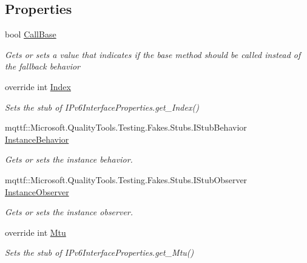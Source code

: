 \subsection*{Properties}
\begin{DoxyCompactItemize}
\item 
bool \hyperlink{class_system_1_1_net_1_1_network_information_1_1_fakes_1_1_stub_i_pv6_interface_properties_a4cad5236d0ed7beeef0dd88210829e15}{Call\-Base}
\begin{DoxyCompactList}\small\item\em Gets or sets a value that indicates if the base method should be called instead of the fallback behavior\end{DoxyCompactList}\item 
override int \hyperlink{class_system_1_1_net_1_1_network_information_1_1_fakes_1_1_stub_i_pv6_interface_properties_aa7bea263d105d3ef6a349b6bcaf1d9f5}{Index}
\begin{DoxyCompactList}\small\item\em Sets the stub of I\-Pv6\-Interface\-Properties.\-get\-\_\-\-Index()\end{DoxyCompactList}\item 
mqttf\-::\-Microsoft.\-Quality\-Tools.\-Testing.\-Fakes.\-Stubs.\-I\-Stub\-Behavior \hyperlink{class_system_1_1_net_1_1_network_information_1_1_fakes_1_1_stub_i_pv6_interface_properties_ae0819522e5ee2500b3af877222c09a76}{Instance\-Behavior}
\begin{DoxyCompactList}\small\item\em Gets or sets the instance behavior.\end{DoxyCompactList}\item 
mqttf\-::\-Microsoft.\-Quality\-Tools.\-Testing.\-Fakes.\-Stubs.\-I\-Stub\-Observer \hyperlink{class_system_1_1_net_1_1_network_information_1_1_fakes_1_1_stub_i_pv6_interface_properties_aead64509aa3ce47952051d8ea42b4355}{Instance\-Observer}
\begin{DoxyCompactList}\small\item\em Gets or sets the instance observer.\end{DoxyCompactList}\item 
override int \hyperlink{class_system_1_1_net_1_1_network_information_1_1_fakes_1_1_stub_i_pv6_interface_properties_af25ea71268c107a10d1c86f0550d9be0}{Mtu}
\begin{DoxyCompactList}\small\item\em Sets the stub of I\-Pv6\-Interface\-Properties.\-get\-\_\-\-Mtu()\end{DoxyCompactList}\end{DoxyCompactItemize}



